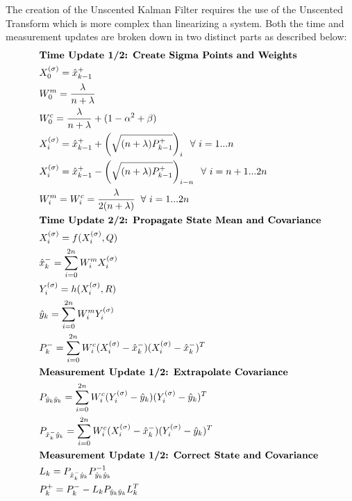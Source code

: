 \documentclass[10pt]{article}
\begin{document}
\begin{enumerate}[label=\textbf{\arabic*.}]
  The creation of the Unscented Kalman Filter requires the use of the Unscented 
  Transform which is more complex than linearizing a system. Both the time and 
  measurement updates are broken down in two distinct parts as described below:
  \begin{equation}
    \begin{split}
      &\text{\textbf{Time Update 1/2: Create Sigma Points and Weights}} \\
      &X_0^{(\sigma)} = \hat{x}_{k-1}^+ \\
      &W_0^{m} = \dfrac{\lambda}{n + \lambda} \\
      &W_0^{c} = \dfrac{\lambda}{n + \lambda} + (1 - \alpha^2 + \beta) \\
      &X_i^{(\sigma)} = \hat{x}_{k-1}^+ + \left(\sqrt{(n+\lambda)P_{k-1}^+}\right)_i \:\text{ $\forall$ $i=1...n$} \\
      &X_i^{(\sigma)} = \hat{x}_{k-1}^+ - \left(\sqrt{(n+\lambda)P_{k-1}^+}\right)_{i-n} \:\text{ $\forall$ $i=n+1...2n$} \\
      &W_i^{m} = W_i^{c} = \dfrac{\lambda}{2(n + \lambda)} \:\text{ $\forall$ $i=1...2n$} \\
      &\text{\textbf{Time Update 2/2: Propagate State Mean and Covariance}} \\
      &X_i^{(\sigma)} = f(X_i^{(\sigma)}, Q) \\
      &\hat{x}_k^- = \sum_{i=0}^{2n} W_i^{m}X_i^{(\sigma)} \\
      &Y_i^{(\sigma)} = h(X_i^{(\sigma)}, R) \\
      &\hat{y}_k = \sum_{i=0}^{2n} W_i^{m}Y_i^{(\sigma)} \\
      &P_k^- = \sum_{i=0}^{2n}  W_i^{c} (X_i^{(\sigma)}-\hat{x}_k^-)(X_i^{(\sigma)}-\hat{x}_k^-)^T \\
      &\text{\textbf{Measurement Update 1/2: Extrapolate Covariance}} \\
      &P_{\hat{y}_{k}\hat{y}_{k}} = \sum_{i=0}^{2n}  W_i^{c} (Y_i^{(\sigma)}-\hat{y}_k)(Y_i^{(\sigma)}-\hat{y}_k)^T \\
      &P_{\hat{x}_{k}^-\hat{y}_{k}} = \sum_{i=0}^{2n}  W_i^{c} (X_i^{(\sigma)}-\hat{x}_k^-)(Y_i^{(\sigma)}-\hat{y}_k)^T \\
      &\text{\textbf{Measurement Update 1/2: Correct State and Covariance}} \\
      &L_k = P_{\hat{x}_{k}^-\hat{y}_{k}} P_{\hat{y}_{k}\hat{y}_{k}}^{-1} \\
      &P_k^+ = P_k^- - L_k P_{\hat{y}_{k}\hat{y}_{k}} L_k^T \\

\end{split}
\end{equation}
\end{enumerate}
\end{document}
